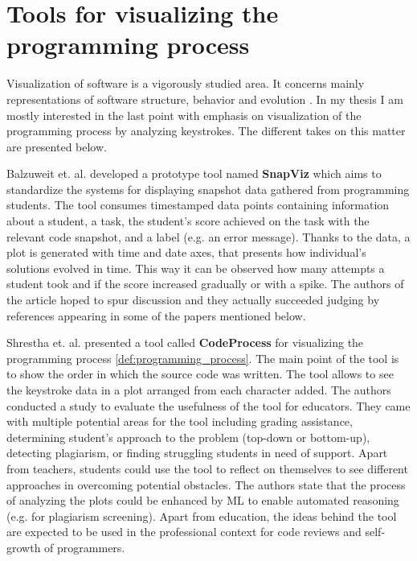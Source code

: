 \section{Tools for visualizing the programming process}

Visualization of software is a vigorously studied area. \cite{Mat16SoftwareVisualizationReview} It concerns mainly representations of software structure, behavior and evolution \cite{DieSoftViz}. In my thesis I am mostly interested in the last point with emphasis on visualization of the programming process by analyzing keystrokes. The different takes on this matter are presented below. 

Balzuweit et. al. \cite{Bal13SnapViz} developed a prototype tool named \textbf{SnapViz} which aims to standardize the systems for displaying snapshot data gathered from programming students. The tool consumes timestamped data points containing information about a student, a task, the student's score achieved on the task with the relevant code snapshot, and a label (e.g. an error message). Thanks to the data, a plot is generated with time and date axes, that presents how individual's solutions evolved in time. This way it can be observed how many attempts a student took and if the score increased gradually or with a spike. The authors of the article hoped to spur discussion and they actually succeeded judging by references appearing in some of the papers mentioned below.

Shrestha et. al. \cite{Shr22CodeProcess} presented a tool called \textbf{CodeProcess} for visualizing the programming process \ref{def:programming_process}. The main point of the tool is to show the order in which the source code was written. The tool allows to see the keystroke data in a plot arranged from each character added. 
The authors conducted a study to evaluate the usefulness of the tool for educators. They came with multiple potential areas for the tool including grading assistance, determining student's approach to the problem (top-down or bottom-up), detecting plagiarism, or finding struggling students in need of support. Apart from teachers, students could use the tool to reflect on themselves to see different approaches in overcoming potential obstacles. The authors state that the process of analyzing the plots could be enhanced by ML to enable automated reasoning (e.g. for plagiarism screening). Apart from education, the ideas behind the tool are expected to be used in the professional context for code reviews and self-growth of programmers.

